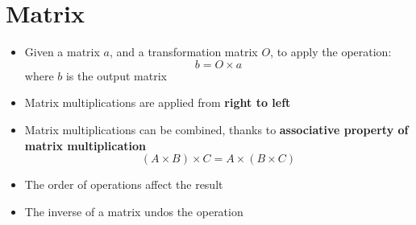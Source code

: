 \chapter{Matrix}

\begin{itemize}
  \item Given a matrix $ a $, and a transformation matrix $ O $, to apply
  the operation:
  \begin{equation}
    b = O \times a
  \end{equation}
  where $ b $ is the output matrix

  \item Matrix multiplications are applied from \textbf{right to left}
  \item Matrix multiplications can be combined, thanks to \textbf{associative
  property of matrix multiplication}
  \begin{equation}
    \left( A \times B \right) \times C = A \times \left( B \times C \right)
  \end{equation}

  \item The order of operations affect the result
  \item The inverse of a matrix undos the operation
\end{itemize}
